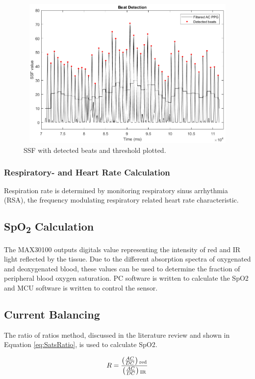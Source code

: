 \begin{figure}[H]
   \centering
   \includegraphics[width=12cm,height=7.5cm]{figs/BeatDetection.png}
   \caption{SSF with detected beats and threshold plotted.}
   \label{fig:BeatDetection}
\end{figure}

\subsubsection{Respiratory- and Heart Rate Calculation}
Respiration rate is determined by monitoring respiratory sinus arrhythmia (RSA), the frequency modulating respiratory related heart rate characteristic.

\subsection{SpO\textsubscript{2} Calculation}
The MAX30100 outputs digitals value representing the intensity of red and IR light reflected by the tissue. Due to the different absorption spectra of oxygenated and deoxygenated blood, these values can be used to determine the fraction of peripheral blood oxygen saturation. PC software is written to calculate the SpO2 and MCU software is written to control the sensor. 

\subsection{Current Balancing}
The ratio of ratios method, discussed in the literature review and shown in Equation \ref{eq:SatsRatio}, is used to calculate SpO2.

\begin{equation}
\label{eq:SatsRatio}
R = \frac{\left(\frac{AC}{DC}\right)\textsubscript{red}}{\left(\frac{AC}{DC}\right)\textsubscript{IR}}
\end{equation}

